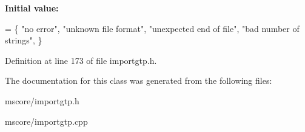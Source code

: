 {\bfseries Initial value\+:}
\begin{DoxyCode}
= \{
      \textcolor{stringliteral}{"no error"},
      \textcolor{stringliteral}{"unknown file format"},
      \textcolor{stringliteral}{"unexpected end of file"},
      \textcolor{stringliteral}{"bad number of strings"},
      \}
\end{DoxyCode}


Definition at line 173 of file importgtp.\+h.



The documentation for this class was generated from the following files\+:\begin{DoxyCompactItemize}
\item 
mscore/importgtp.\+h\item 
mscore/importgtp.\+cpp\end{DoxyCompactItemize}
